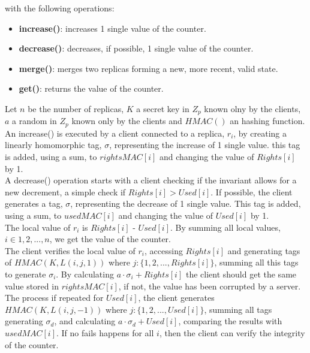 \documentclass{article}
\begin{document}
with the following operations:
\begin{itemize}
    \item \textbf{increase()}: increases 1 single value of the counter.
    \item \textbf{decrease()}: decreases, if possible, 1 single value of the counter.
    \item \textbf{merge()}: merges two replicas forming a new, more recent, valid state.
    \item \textbf{get()}: returns the value of the counter.
\end{itemize}

Let $n$ be the number of replicas, $K$ a secret key in $Z_p$ known olny by the clients, $a$ a random in $Z_p$ known only by the clients and $HMAC()$ an hashing function.\\

An increase() is executed by a client connected to a replica, $r_i$, by creating a linearly homomorphic tag, $\sigma$, representing the increase of 1 single value. this tag is added, using a sum, to $rightsMAC[i]$ and changing the value of $Rights[i]$ by 1.\\

A decrease() operation starts with a client checking if the invariant allows for a new decrement, a simple check if $Rights[i]>Used[i]$. If possible, the client generates a tag, $\sigma$, representing the decrease of 1 single value. This tag is added, using a sum, to $usedMAC[i]$ and changing the value of $Used[i]$ by 1.\\

The local value of $r_i$ is $Rights[i]$ - $Used[i]$. By summing all local values, $i \in {1,2,...,n}$, we get the value of the counter.\\

The client verifies the local value of $r_i$, accessing $Rights[i]$ and generating tags of $HMAC(K,L(i,j,1))$ where $j: \{1,2,...,Rights[i]\}$, summing all this tags to generate $\sigma_i$. By calculating $a \cdot \sigma_i + Rights[i]$ the client should get the same value stored in $rightsMAC[i]$, if not, the value has been corrupted by a server. The process if repeated for $Used[i]$, the client generates $HMAC(K,L(i,j,-1))$ where $j: \{1,2,...,Used[i]\}$, summing all tags generating $\sigma_d$, and calculating $a \cdot \sigma_d + Used[i]$, comparing the results with $usedMAC[i]$. If no fails happens for all $i$, then the client can verify the integrity of the counter.\\
\end{document}
